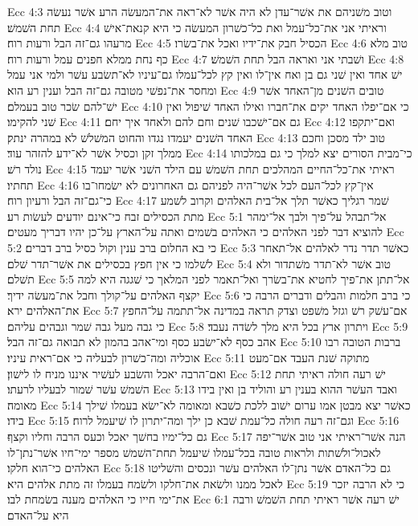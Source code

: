 Ecc 4:3  וטוב משׁניהם את אשׁר־עדן לא היה אשׁר לא־ראה את־המעשׂה הרע אשׁר נעשׂה תחת השׁמשׁ׃
Ecc 4:4  וראיתי אני את־כל־עמל ואת כל־כשׁרון המעשׂה כי היא קנאת־אישׁ מרעהו גם־זה הבל ורעות רוח׃
Ecc 4:5  הכסיל חבק את־ידיו ואכל את־בשׂרו׃
Ecc 4:6  טוב מלא כף נחת ממלא חפנים עמל ורעות רוח׃
Ecc 4:7  ושׁבתי אני ואראה הבל תחת השׁמשׁ׃
Ecc 4:8  ישׁ אחד ואין שׁני גם בן ואח אין־לו ואין קץ לכל־עמלו גם־עיניו לא־תשׂבע עשׁר ולמי אני עמל ומחסר את־נפשׁי מטובה גם־זה הבל וענין רע הוא׃
Ecc 4:9  טובים השׁנים מן־האחד אשׁר ישׁ־להם שׂכר טוב בעמלם׃
Ecc 4:10  כי אם־יפלו האחד יקים את־חברו ואילו האחד שׁיפול ואין שׁני להקימו׃
Ecc 4:11  גם אם־ישׁכבו שׁנים וחם להם ולאחד איך יחם׃
Ecc 4:12  ואם־יתקפו האחד השׁנים יעמדו נגדו והחוט המשׁלשׁ לא במהרה ינתק׃
Ecc 4:13  טוב ילד מסכן וחכם ממלך זקן וכסיל אשׁר לא־ידע להזהר עוד׃
Ecc 4:14  כי־מבית הסורים יצא למלך כי גם במלכותו נולד רשׁ׃
Ecc 4:15  ראיתי את־כל־החיים המהלכים תחת השׁמשׁ עם הילד השׁני אשׁר יעמד תחתיו׃
Ecc 4:16  אין־קץ לכל־העם לכל אשׁר־היה לפניהם גם האחרונים לא ישׂמחו־בו כי־גם־זה הבל ורעיון רוח׃
Ecc 4:17  שׁמר רגליך כאשׁר תלך אל־בית האלהים וקרוב לשׁמע מתת הכסילים זבח כי־אינם יודעים לעשׂות רע׃
Ecc 5:1  אל־תבהל על־פיך ולבך אל־ימהר להוציא דבר לפני האלהים כי האלהים בשׁמים ואתה על־הארץ על־כן יהיו דבריך מעטים׃
Ecc 5:2  כי בא החלום ברב ענין וקול כסיל ברב דברים׃
Ecc 5:3  כאשׁר תדר נדר לאלהים אל־תאחר לשׁלמו כי אין חפץ בכסילים את אשׁר־תדר שׁלם׃
Ecc 5:4  טוב אשׁר לא־תדר משׁתדור ולא תשׁלם׃
Ecc 5:5  אל־תתן את־פיך לחטיא את־בשׂרך ואל־תאמר לפני המלאך כי שׁגגה היא למה יקצף האלהים על־קולך וחבל את־מעשׂה ידיך׃
Ecc 5:6  כי ברב חלמות והבלים ודברים הרבה כי את־האלהים ירא׃
Ecc 5:7  אם־עשׁק רשׁ וגזל משׁפט וצדק תראה במדינה אל־תתמה על־החפץ כי גבה מעל גבה שׁמר וגבהים עליהם׃
Ecc 5:8  ויתרון ארץ בכל היא מלך לשׂדה נעבד׃
Ecc 5:9  אהב כסף לא־ישׂבע כסף ומי־אהב בהמון לא תבואה גם־זה הבל׃
Ecc 5:10  ברבות הטובה רבו אוכליה ומה־כשׁרון לבעליה כי אם־ראית עיניו׃
Ecc 5:11  מתוקה שׁנת העבד אם־מעט ואם־הרבה יאכל והשׂבע לעשׁיר איננו מניח לו לישׁון׃
Ecc 5:12  ישׁ רעה חולה ראיתי תחת השׁמשׁ עשׁר שׁמור לבעליו לרעתו׃
Ecc 5:13  ואבד העשׁר ההוא בענין רע והוליד בן ואין בידו מאומה׃
Ecc 5:14  כאשׁר יצא מבטן אמו ערום ישׁוב ללכת כשׁבא ומאומה לא־ישׂא בעמלו שׁילך בידו׃
Ecc 5:15  וגם־זה רעה חולה כל־עמת שׁבא כן ילך ומה־יתרון לו שׁיעמל לרוח׃
Ecc 5:16  גם כל־ימיו בחשׁך יאכל וכעס הרבה וחליו וקצף׃
Ecc 5:17  הנה אשׁר־ראיתי אני טוב אשׁר־יפה לאכול־ולשׁתות ולראות טובה בכל־עמלו שׁיעמל תחת־השׁמשׁ מספר ימי־חיו אשׁר־נתן־לו האלהים כי־הוא חלקו׃
Ecc 5:18  גם כל־האדם אשׁר נתן־לו האלהים עשׁר ונכסים והשׁליטו לאכל ממנו ולשׂאת את־חלקו ולשׂמח בעמלו זה מתת אלהים היא׃
Ecc 5:19  כי לא הרבה יזכר את־ימי חייו כי האלהים מענה בשׂמחת לבו׃
Ecc 6:1  ישׁ רעה אשׁר ראיתי תחת השׁמשׁ ורבה היא על־האדם׃
